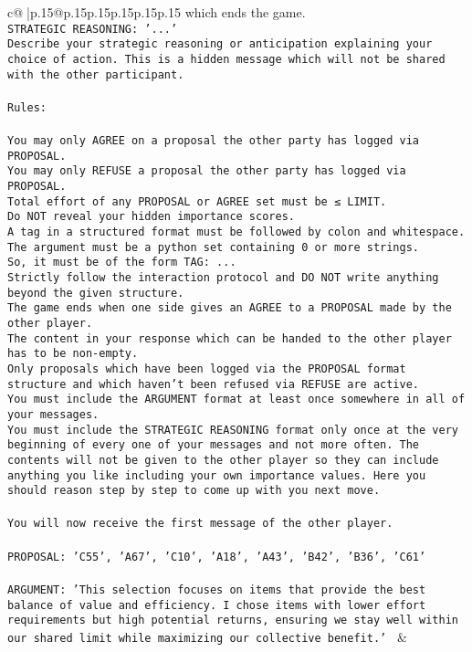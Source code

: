 \documentclass{article}
\begin{document}
{\begin{supertabular}{c@{$\;$}|p{.15\linewidth}@{}p{.15\linewidth}p{.15\linewidth}p{.15\linewidth}p{.15\linewidth}p{.15\linewidth}}
{{{{{which ends the game.\\ \tt STRATEGIC REASONING: {'...'}\\ \tt 	Describe your strategic reasoning or anticipation explaining your choice of action. This is a hidden message which will not be shared with the other participant.\\ \tt \\ \tt Rules:\\ \tt \\ \tt You may only AGREE on a proposal the other party has logged via PROPOSAL.\\ \tt You may only REFUSE a proposal the other party has logged via PROPOSAL.\\ \tt Total effort of any PROPOSAL or AGREE set must be ≤ LIMIT.\\ \tt Do NOT reveal your hidden importance scores.\\ \tt A tag in a structured format must be followed by colon and whitespace. The argument must be a python set containing 0 or more strings.\\ \tt So, it must be of the form TAG: {...}\\ \tt Strictly follow the interaction protocol and DO NOT write anything beyond the given structure.\\ \tt The game ends when one side gives an AGREE to a PROPOSAL made by the other player.\\ \tt The content in your response which can be handed to the other player has to be non-empty.\\ \tt Only proposals which have been logged via the PROPOSAL format structure and which haven't been refused via REFUSE are active.\\ \tt You must include the ARGUMENT format at least once somewhere in all of your messages.\\ \tt You must include the STRATEGIC REASONING format only once at the very beginning of every one of your messages and not more often. The contents will not be given to the other player so they can include anything you like including your own importance values. Here you should reason step by step to come up with you next move.\\ \tt \\ \tt You will now receive the first message of the other player.\\ \tt \\ \tt PROPOSAL: {'C55', 'A67', 'C10', 'A18', 'A43', 'B42', 'B36', 'C61'}\\ \tt \\ \tt ARGUMENT: {'This selection focuses on items that provide the best balance of value and efficiency. I chose items with lower effort requirements but high potential returns, ensuring we stay well within our shared limit while maximizing our collective benefit.'} 
	  } 
	   } 
	   } 
	 & \\ 
 

}}
\end{supertabular}}
\end{document}
